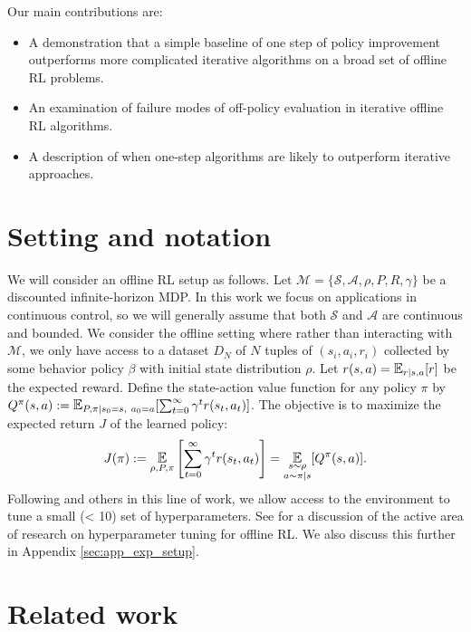 Our main contributions are:
\begin{itemize}[leftmargin=*]
    \item A demonstration that a simple baseline of one step of policy improvement outperforms more complicated iterative algorithms on a broad set of offline RL problems.
    \item An examination of failure modes of off-policy evaluation in iterative offline RL algorithms.
    \item A description of when one-step algorithms are likely to outperform iterative approaches.
\end{itemize}



\vspace{0.2cm}
\section{Setting and notation}

We will consider an offline RL setup as follows. Let $ \mathcal{M} = \{\mathcal{S}, \mathcal{A}, \rho, P, R, \gamma \}$ be a discounted infinite-horizon  MDP.
In this work we focus on applications in continuous control, so we will generally assume that both $ \mathcal{S}$ and $ \mathcal{A}$ are continuous and bounded.
We consider the offline setting where rather than interacting with $\mathcal{M}$, we only have access to a dataset $ D_N$ of $ N $ tuples of $ (s_i, a_i, r_i)$ collected by some behavior policy $ \beta$ with initial state distribution $ \rho$.
Let $ r(s,a) = \E_{r|s,a}[r]$ be the expected reward.
Define the state-action value function for any policy $ \pi$ by $ Q^\pi(s,a) := \E_{P, \pi | s_0 = s,\ a_0 = a}[\sum_{t=0}^\infty \gamma^t r(s_t, a_t)]$.
The objective is to maximize the expected return $ J $ of the learned policy:
\begin{align}
    J(\pi) := \E_{\rho, P, \pi}\left[ \sum_{t=0}^\infty \gamma^t r(s_t, a_t) \right] = \E_{\substack{s\sim \rho\\ a \sim \pi|s}}[Q^\pi(s,a)]. %
\end{align}
Following \citet{fu2020d4rl} and others in this line of work, we allow access to the environment to tune a small (< 10) set of hyperparameters.
See \citet{paine2020hyperparameter} for a discussion of the active area of research on hyperparameter tuning for offline RL.
We also discuss this further in Appendix \ref{sec:app_exp_setup}.


\section{Related work}

